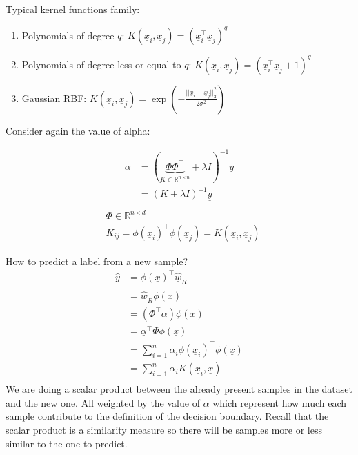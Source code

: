 Typical kernel functions family:
\begin{enumerate}[i]
    \item Polynomials of degree $q$: $K(\underline{x}_i, \underline{x}_j) = (\underline{x}_i^\intercal \underline{x}_j)^q$
    \item Polynomials of degree less or equal to $q$: $K(\underline{x}_i, \underline{x}_j) = (\underline{x}_i^\intercal \underline{x}_j + 1)^q$
    \item Gaussian RBF: $K(\underline{x}_i, \underline{x}_j) = \exp(-\frac{||\underline{x}_i - \underline{x}_j||_2^2}{2\sigma^2})$
\end{enumerate}
Consider again the value of alpha:
\begin{multicols}{2}
    \[
        \begin{split}
            \underline{\alpha} &= (\underbrace{\Phi\Phi^\intercal}_{K \in \mathbb{R}^{n\times n}} + \lambda I)^{-1} \underline{y} \\
            &= (K + \lambda I)^{-1} \underline{y}\\    
        \end{split}
\]
\vspace{0.2cm}
\[
    \begin{split}
        &\Phi \in \mathbb{R}^{n \times d}    \\
    &K_{ij} = \phi(\underline{x}_i)^\intercal \phi(\underline{x}_j) = K(\underline{x}_i, \underline{x}_j)   
    \end{split} 
\]
\end{multicols}
How to predict a label from a new sample?
\[
    \begin{split}
        \hat{y} &= \phi(\underline{x})^\intercal \underline{\hat{w}}_R \\
        &= \underline{\hat{w}}_R^\intercal \phi(\underline{x})\\
        &= (\Phi^\intercal \underline{\alpha})\phi(\underline{x})\\
        &= \underline{\alpha}^\intercal \Phi \phi(\underline{x})\\
        &= \sum_{i=1}^n \alpha_i \phi(\underline{x}_i)^\intercal \phi(\underline{x})\\
        &= \sum_{i=1}^n \alpha_i K(\underline{x}_i, \underline{x})\\
    \end{split}
\]
We are doing a scalar product between the already present samples in the dataset and the new one. All weighted by the value of $\alpha$ which represent how much each sample contribute to the definition of the decision boundary. Recall that the scalar product is a similarity measure so there will be samples more or less similar to the one to predict. 